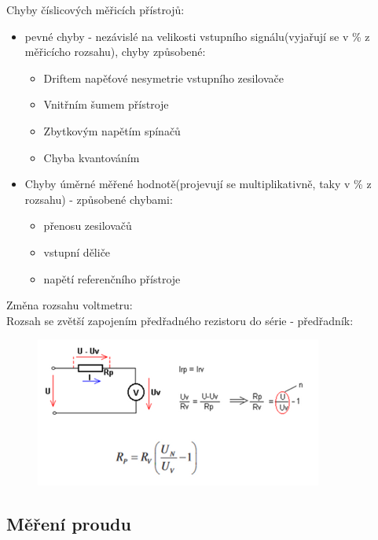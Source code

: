 Chyby číslicových měřicích přístrojů:
\begin{itemize}
    \item pevné chyby - nezávislé na velikosti vstupního signálu(vyjařují se v \% z měřicícho rozsahu), chyby způsobené:
    \begin{itemize}
        \item Driftem napěťové nesymetrie vstupního zesilovače
        \item Vnitřním šumem přístroje
        \item Zbytkovým napětím spínačů
        \item Chyba kvantováním
    \end{itemize}
    \item Chyby úměrné měřené hodnotě(projevují se multiplikativně, taky v \% z rozsahu) - způsobené chybami:
        \begin{itemize}
            \item přenosu zesilovačů
            \item vstupní děliče
            \item napětí referenčního přístroje
        \end{itemize}
\end{itemize}
Změna rozsahu voltmetru:\\
Rozsah se zvětší zapojením předřadného rezistoru do série - předřadník:\\
\begin{figure}[H]
    \includegraphics*[scale = 1.5]{images/predradnik.png}    
\end{figure}

\subsection*{Měření proudu}

